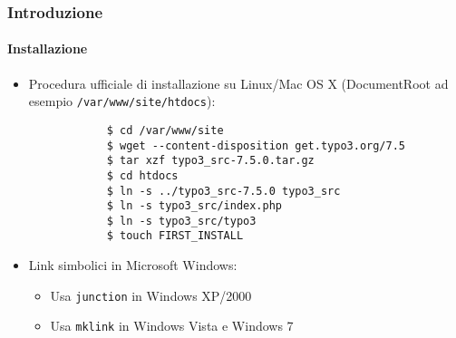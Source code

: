 \begin{frame}[fragile]
	\frametitle{Introduzione}
	\framesubtitle{Installazione}

	\begin{itemize}
		\item Procedura ufficiale di installazione su Linux/Mac OS X\newline
			(DocumentRoot ad esempio \texttt{/var/www/site/htdocs}):
		\begin{lstlisting}
			$ cd /var/www/site
			$ wget --content-disposition get.typo3.org/7.5
			$ tar xzf typo3_src-7.5.0.tar.gz
			$ cd htdocs
			$ ln -s ../typo3_src-7.5.0 typo3_src
			$ ln -s typo3_src/index.php
			$ ln -s typo3_src/typo3
			$ touch FIRST_INSTALL
		\end{lstlisting}

		\item Link simbolici in Microsoft Windows:

			\begin{itemize}
				\item Usa \texttt{junction} in Windows XP/2000
				\item Usa \texttt{mklink} in Windows Vista e Windows 7
			\end{itemize}

	\end{itemize}
\end{frame}

